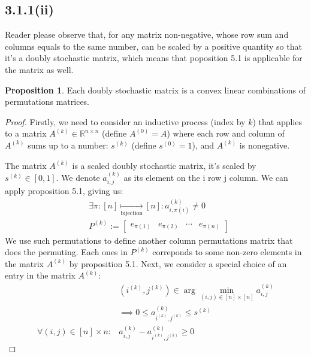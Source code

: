 \documentclass[]{article}
\theoremstyle{definition}
\newtheorem{prop}{Proposition}[section]  %
\begin{document}
    \subsection{3.1.1(ii)}
        Reader please observe that, for any matrix non-negative, whose row sum and columns equals to the same number, can be scaled by a positive quantity so that it's a doubly stochastic matrix, which means that poposition 5.1 is applicable for the matrix as well. 
        \begin{prop}
            Each doubly stochastic matrix is a convex linear combinations of permutations matrices. 
        \end{prop}
        \begin{proof}
            Firstly, we need to consider an inductive process (index by $k$) that applies to a matrix $A^{(k)}\in \mathbb R^{n\times n}$ (define $A^{(0)} = A$) where each row and column of $A^{(k)}$ sums up to a number: $s^{(k)}$ (define $s^{(0)} = 1$), and $A^{(k)}$ is nonegative. 
            \par
            The matrix $A^{(k)}$ is a scaled doubly stochastic matrix, it's scaled by $s^{(k)}\in [0, 1]$. We denote $a_{i, j}^{(k)}$ as its element on the i row j column. We can apply proposition 5.1, giving us: 
            \begin{align}
                & 
                \exists \pi: [n]\underset{\text{bijection}}{\mapsto}[n]: 
                a^{(k)}_{i,\pi(i)}\neq 0
                \\
                & 
                P^{(k)} := \begin{bmatrix}
                    e_{\pi(1)} & e_{\pi(2)}& \cdots & e_{\pi(n)}
                \end{bmatrix}
            \end{align}
            We use such permutations to define another column permutations matrix that does the permuting. Each ones in $P^{(k)}$ correponds to some non-zero elements in the matrix $A^{(k)}$ by proposition 5.1. Next, we consider a special choice of an entry in the matrix $A^{(k)}$: 
            \begin{align}
                & (i^{(k)}, j^{(k)}) \in \arg\min_{(i, j)\in [n]\times [n]}
                a^{(k)}_{i, j}
                \\
                & \implies 0 \le a^{(k)}_{i^{(k)}, j^{(k)}} \le s^{(k)}
                \\
                \forall (i, j)\in [n]\times n: 
                & a^{(k)}_{i, j} - a^{(k)}_{i^{(k)}, j^{(k)}} \ge 0

\end{align}
\end{proof}
\end{document}
